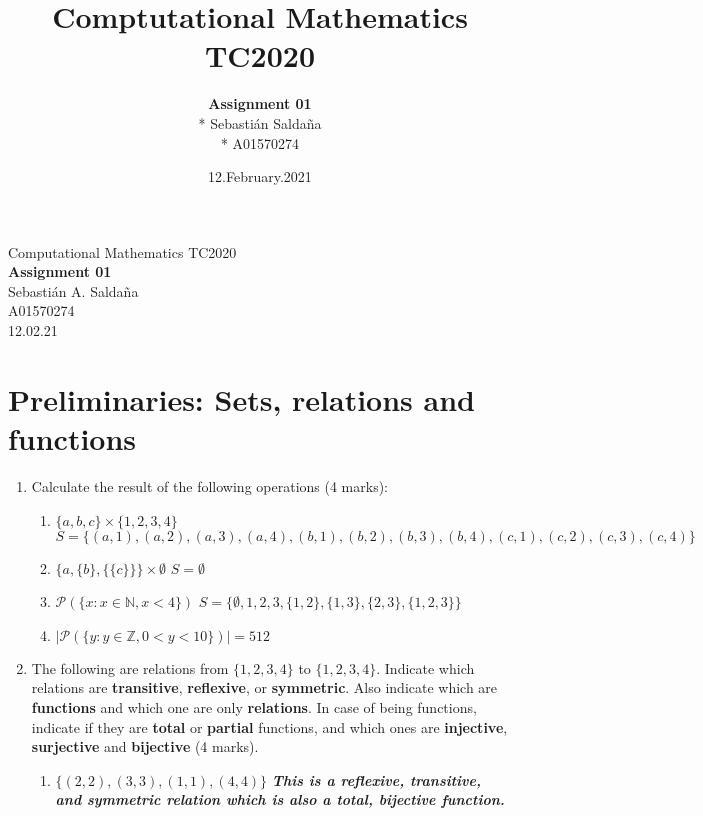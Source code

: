\documentclass[]{book}
\title{Comptutational Mathematics TC2020}
\author{\textbf{Assignment 01} \\* Sebastián Saldaña \\* A01570274}
\date{12.February.2021}
\theoremstyle{definition}
\begin{document}
\begin{center}
    {\huge Computational Mathematics TC2020}\\[1.5ex]
    {\large \textbf{Assignment 01}\\[1.5ex] 
    Sebastián A. Saldaña\\
    A01570274\\%
    12.02.21} %
    \end{center}
    
    \vspace{0.2 cm}

    \section*{Preliminaries: Sets, relations and functions}
    \begin{enumerate}
        \item Calculate the result of the following operations (4 marks):
        \begin{enumerate}
            \item $\{a,b,c\} \times \{1,2,3,4\}$ \newline
            $S = \{(a,1),(a,2),(a,3),(a,4),(b,1),(b,2),(b,3),(b,4),(c,1),(c,2),(c,3),(c,4)\}$
            \item $\{a,\{b\},\{\{c\}\}\} \times \emptyset$ \newline $S = \emptyset$
            \item $\mathcal{P}(\{x : x \in \mathbb{N}, x < 4\})$ \newline
            $S = \{\emptyset,1,2,3,\{1,2\},\{1,3\},\{2,3\},\{1,2,3\}\}$
            \item $\vert\mathcal{P}(\{y : y \in \mathbb{Z},0 < y < 10\})\vert = 512$
        \end{enumerate}
        \item The following are relations from $\{1,2,3,4\}$ to $\{1,2,3,4\}$. Indicate which relations are \textbf{transitive}, \textbf{reflexive}, or \textbf{symmetric}. Also indicate which are \textbf{functions} and which one are only \textbf{relations}. In case of being functions, indicate if they are \textbf{total} or \textbf{partial} functions, and which ones are \textbf{injective}, \textbf{surjective} and \textbf{bijective} (4 marks).
        \begin{enumerate}
            \item $\{(2,2),(3,3),(1,1),(4,4)\}$ \emph{\textbf{This is a reflexive, transitive, and symmetric relation which is also a total, bijective function.}}

\end{enumerate}
\end{enumerate}
\end{document}
